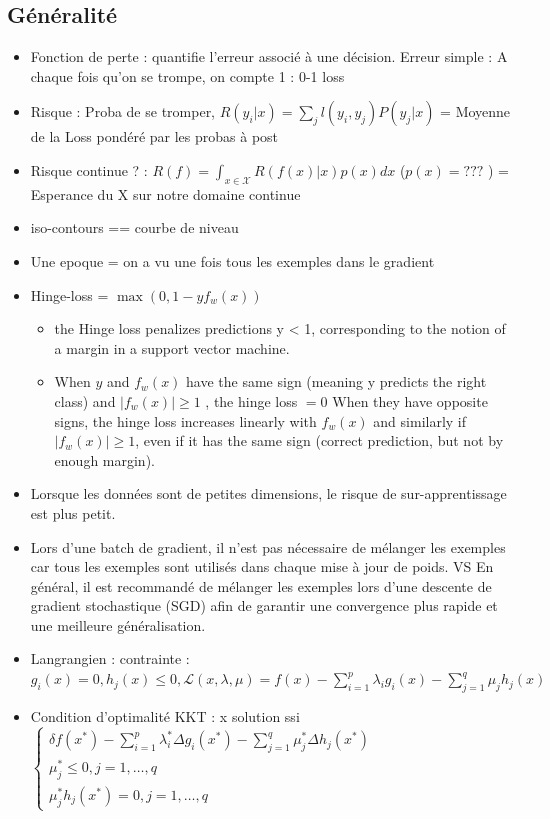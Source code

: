 \documentclass{article}
\begin{document}
\footnotesize
\begin{multicols}{2}

\section{Généralité}
\begin{itemize}
    \item Fonction de perte : quantifie l'erreur associé à une décision. Erreur simple : A chaque fois qu'on se trompe, on compte 1 : 0-1 loss
    \item Risque : Proba de se tromper, $ R(y_i | x) = \sum_{j}^{} l(y_i, y_j)P(y_j | x)$ = Moyenne de la Loss pondéré par les probas à post
    \item Risque continue ? : $ R(f) = \int_{x \in \mathcal{X}}^{}R(f(x)|x)p(x) dx  $ ($ p(x) = ??? $ ) = Esperance du X sur notre domaine continue
    \item iso-contours == courbe de niveau
    \item Une epoque = on a vu une fois tous les exemples dans le gradient
    \item Hinge-loss = $ \max (0, 1 - y f_w(x)) $ \begin{itemize}
        \item the Hinge loss penalizes predictions y < 1, corresponding to the notion of a margin in a support vector machine.
        \item When $ y $ and $ f_w(x) $ have the same sign (meaning y predicts the right class) and $ \left| f_w(x) \right| \geq 1 $ , the hinge loss $ = 0 $  When they have opposite signs, the hinge loss increases linearly with $ f_w(x) $  and similarly if $ \left| f_w(x) \right| \geq 1 $, even if it has the same sign (correct prediction, but not by enough margin).
    \end{itemize}
    \item Lorsque les données sont de petites dimensions, le risque de sur-apprentissage est plus petit.
    \item Lors d'une batch de gradient, il n'est pas nécessaire de mélanger les exemples car tous les exemples sont utilisés dans chaque mise à jour de poids. VS En général, il est recommandé de mélanger les exemples lors d'une descente de gradient stochastique (SGD) afin de garantir une convergence plus rapide et une meilleure généralisation.
    \item Langrangien : contrainte : $ \displaystyle g_i(x) = 0, h_j(x) \leq 0, \mathcal{L}(x, \lambda , \mu ) = f(x) - \sum_{i=1}^{p} \lambda _i g_i(x) - \sum_{j=1}^{q} \mu _j h_j(x)$
    \item Condition d'optimalité KKT : x solution ssi $ \displaystyle \begin{cases}
        \delta f(x^*) - \sum_{i=1}^{p} \lambda _i^* \Delta g_i(x^*) - \sum_{j=1}^{q} \mu _j^* \Delta  h_j(x^*)\\
        \mu _j ^* \leq 0, j = 1, \dots, q \\
        \mu _j^* h_j(x^*) = 0, j = 1, \dots, q
    \end{cases}  $ 
\end{itemize}


\end{multicols}
\end{document}
